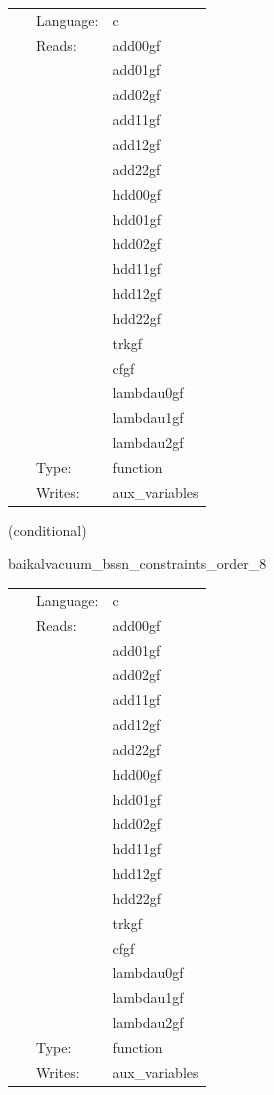  \begin{tabular*}{160mm}{cll} 
~ & Language:  & c \\ 
~ & Reads:  & add00gf \\ 
~& ~ &add01gf\\ 
~& ~ &add02gf\\ 
~& ~ &add11gf\\ 
~& ~ &add12gf\\ 
~& ~ &add22gf\\ 
~& ~ &hdd00gf\\ 
~& ~ &hdd01gf\\ 
~& ~ &hdd02gf\\ 
~& ~ &hdd11gf\\ 
~& ~ &hdd12gf\\ 
~& ~ &hdd22gf\\ 
~& ~ &trkgf\\ 
~& ~ &cfgf\\ 
~& ~ &lambdau0gf\\ 
~& ~ &lambdau1gf\\ 
~& ~ &lambdau2gf\\ 
~ & Type:  & function \\ 
~ & Writes:  & aux\_variables \\ 
\end{tabular*} 


\vspace{5mm}

   (conditional) 

\hspace{5mm} baikalvacuum\_bssn\_constraints\_order\_8 

\hspace{5mm}{\it compute bssn hamiltonian, momentum, and conformal connection constraints, at finite-differencing order 8 } 


\hspace{5mm}

 \begin{tabular*}{160mm}{cll} 
~ & Language:  & c \\ 
~ & Reads:  & add00gf \\ 
~& ~ &add01gf\\ 
~& ~ &add02gf\\ 
~& ~ &add11gf\\ 
~& ~ &add12gf\\ 
~& ~ &add22gf\\ 
~& ~ &hdd00gf\\ 
~& ~ &hdd01gf\\ 
~& ~ &hdd02gf\\ 
~& ~ &hdd11gf\\ 
~& ~ &hdd12gf\\ 
~& ~ &hdd22gf\\ 
~& ~ &trkgf\\ 
~& ~ &cfgf\\ 
~& ~ &lambdau0gf\\ 
~& ~ &lambdau1gf\\ 
~& ~ &lambdau2gf\\ 
~ & Type:  & function \\ 
~ & Writes:  & aux\_variables \\ 
\end{tabular*} 


